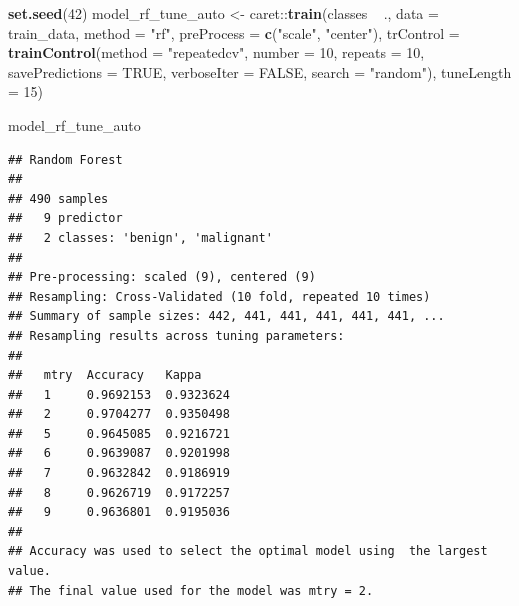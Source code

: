 \documentclass[]{article}
\newenvironment{Shaded}{\begin{snugshade}}{\end{snugshade}}
\newcommand{\KeywordTok}[1]{\textcolor[rgb]{0.13,0.29,0.53}{\textbf{{#1}}}}
\newcommand{\DataTypeTok}[1]{\textcolor[rgb]{0.13,0.29,0.53}{{#1}}}
\newcommand{\DecValTok}[1]{\textcolor[rgb]{0.00,0.00,0.81}{{#1}}}
\newcommand{\StringTok}[1]{\textcolor[rgb]{0.31,0.60,0.02}{{#1}}}
\newcommand{\OtherTok}[1]{\textcolor[rgb]{0.56,0.35,0.01}{{#1}}}
\newcommand{\NormalTok}[1]{{#1}}
\begin{document}
\begin{Shaded}
\begin{Highlighting}[]
\KeywordTok{set.seed}\NormalTok{(}\DecValTok{42}\NormalTok{)}
\NormalTok{model_rf_tune_auto <-}\StringTok{ }\NormalTok{caret::}\KeywordTok{train}\NormalTok{(classes ~}\StringTok{ }\NormalTok{.,}
                         \DataTypeTok{data =} \NormalTok{train_data,}
                         \DataTypeTok{method =} \StringTok{"rf"}\NormalTok{,}
                         \DataTypeTok{preProcess =} \KeywordTok{c}\NormalTok{(}\StringTok{"scale"}\NormalTok{, }\StringTok{"center"}\NormalTok{),}
                         \DataTypeTok{trControl =} \KeywordTok{trainControl}\NormalTok{(}\DataTypeTok{method =} \StringTok{"repeatedcv"}\NormalTok{, }
                                                  \DataTypeTok{number =} \DecValTok{10}\NormalTok{, }
                                                  \DataTypeTok{repeats =} \DecValTok{10}\NormalTok{, }
                                                  \DataTypeTok{savePredictions =} \OtherTok{TRUE}\NormalTok{, }
                                                  \DataTypeTok{verboseIter =} \OtherTok{FALSE}\NormalTok{,}
                                                  \DataTypeTok{search =} \StringTok{"random"}\NormalTok{),}
                         \DataTypeTok{tuneLength =} \DecValTok{15}\NormalTok{)}
\end{Highlighting}
\end{Shaded}

\begin{Shaded}
\begin{Highlighting}[]
\NormalTok{model_rf_tune_auto}
\end{Highlighting}
\end{Shaded}

\begin{verbatim}
## Random Forest 
## 
## 490 samples
##   9 predictor
##   2 classes: 'benign', 'malignant' 
## 
## Pre-processing: scaled (9), centered (9) 
## Resampling: Cross-Validated (10 fold, repeated 10 times) 
## Summary of sample sizes: 442, 441, 441, 441, 441, 441, ... 
## Resampling results across tuning parameters:
## 
##   mtry  Accuracy   Kappa    
##   1     0.9692153  0.9323624
##   2     0.9704277  0.9350498
##   5     0.9645085  0.9216721
##   6     0.9639087  0.9201998
##   7     0.9632842  0.9186919
##   8     0.9626719  0.9172257
##   9     0.9636801  0.9195036
## 
## Accuracy was used to select the optimal model using  the largest value.
## The final value used for the model was mtry = 2.
\end{verbatim}
\end{document}
